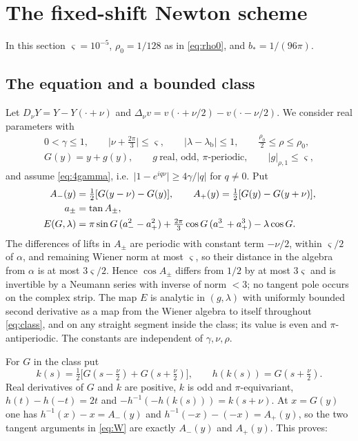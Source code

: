 \documentclass[11pt]{amsart}
\numberwithin{equation}{section}
\theoremstyle{definition}
\theoremstyle{remark}
\newcommand{\abs}[1]{\lvert #1\rvert}
\newcommand{\lb}{\lambda_{\mathrm b}}
\begin{document}
\section{The fixed-shift Newton scheme}\label{sec:d4newton}

In this section $\varsigma=10^{-5}$, $\rho_0=1/128$ as in \eqref{eq:rho0}, and $b_*=1/(96\pi)$.

\subsection{The equation and a bounded class}
Let $D_\nu Y=Y-Y(\cdot+\nu)$ and $\Delta_\nu v=v(\cdot+\nu/2)-v(\cdot-\nu/2)$. We consider real parameters with
\begin{equation}\label{eq:class}
\begin{gathered}
0<\gamma\le1,\qquad \abs{\nu+\tfrac{2\pi}3}\le\varsigma,\qquad \abs{\lambda-\lb}\le1,\qquad \tfrac{\rho_0}2\le\rho\le\rho_0,\\
G(y)=y+g(y),\qquad g\ \text{real, odd, $\pi$-periodic},\qquad \abs g_{\rho,1}\le\varsigma,
\end{gathered}
\end{equation}
and assume \eqref{eq:4gamma}, i.e.\ $\abs{1-e^{iq\nu}}\ge4\gamma/\abs q$ for $q\ne0$. Put
\begin{align}
A_-(y)&=\tfrac12[G(y-\nu)-G(y)],\qquad A_+(y)=\tfrac12[G(y)-G(y+\nu)],\notag\\
a_\pm&=\tan A_\pm,\notag\\
E(G,\lambda)&=\pi\sin G\,(a_-^2-a_+^2)+\tfrac{2\pi}3\cos G\,(a_-^3+a_+^3)-\lambda\cos G.\label{eq:E}
\end{align}
The differences of lifts in $A_\pm$ are periodic with constant term $-\nu/2$, within $\varsigma/2$ of $\alpha$, and remaining Wiener norm at most $\varsigma$, so their distance in the algebra from $\alpha$ is at most $3\varsigma/2$. Hence $\cos A_\pm$ differs from $1/2$ by at most $3\varsigma$ and is invertible by a Neumann series with inverse of norm $<3$; no tangent pole occurs on the complex strip. The map $E$ is analytic in $(g,\lambda)$ with uniformly bounded second derivative as a map from the Wiener algebra to itself throughout \eqref{eq:class}, and on any straight segment inside the class; its value is even and $\pi$-antiperiodic. The constants are independent of $\gamma,\nu,\rho$.

For $G$ in the class put
\begin{equation}\label{eq:khG}
k(s)=\tfrac12\bigl[G(s-\tfrac\nu2)+G(s+\tfrac\nu2)\bigr],\qquad h(k(s))=G(s+\tfrac\nu2).
\end{equation}
Real derivatives of $G$ and $k$ are positive, $k$ is odd and $\pi$-equivariant, $h(t)-h(-t)=2t$ and $-h^{-1}(-h(k(s)))=k(s+\nu)$. At $x=G(y)$ one has $h^{-1}(x)-x=A_-(y)$ and $h^{-1}(-x)-(-x)=A_+(y)$, so the two tangent arguments in \eqref{eq:W} are exactly $A_-(y)$ and $A_+(y)$. This proves:
\end{document}
